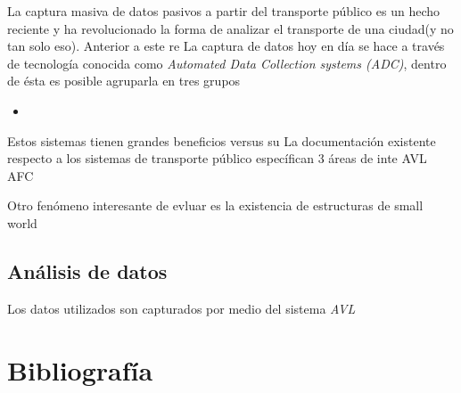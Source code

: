\documentclass[12pt]{article}
\begin{document}
    La captura masiva de datos pasivos a partir del transporte público es un hecho reciente y ha revolucionado la forma de analizar el transporte de una ciudad(y no tan solo eso). Anterior a este re
    La captura de datos hoy en día se hace a través de tecnología conocida como \textit{Automated Data Collection systems (ADC)}, dentro de ésta es posible agruparla en tres grupos

    \begin{itemize}
        \item 
    \end{itemize}

    Estos sistemas tienen grandes beneficios versus su 
    La documentación existente respecto a los sistemas de transporte público específican 3 áreas de inte AVL AFC


    Otro fenómeno interesante de evluar es la existencia de estructuras de small world
        \subsection{Análisis de datos}

        Los datos utilizados son capturados por medio del sistema \textit{AVL}

    \newpage
    \section{Bibliografía}

    \renewcommand{\section}[2]{} %

    
    
    \nocite{libro_visualizacion} %

    
\end{document}
